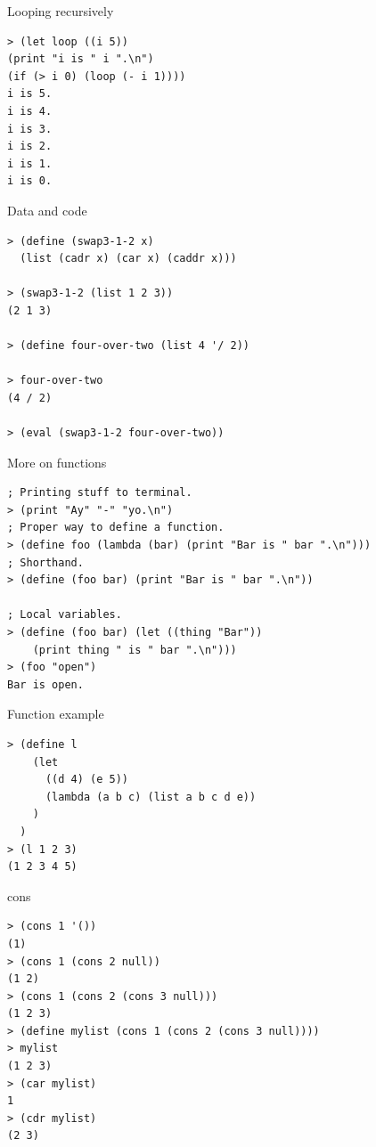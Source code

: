 \begin{frame}[fragile]{Looping recursively}
\begin{verbatim}
> (let loop ((i 5))
(print "i is " i ".\n")
(if (> i 0) (loop (- i 1))))
i is 5.
i is 4.
i is 3.
i is 2.
i is 1.
i is 0.
\end{verbatim}
\end{frame}

\begin{frame}[fragile]{Data and code}
\begin{verbatim}
> (define (swap3-1-2 x)
  (list (cadr x) (car x) (caddr x)))

> (swap3-1-2 (list 1 2 3))
(2 1 3)

> (define four-over-two (list 4 '/ 2))

> four-over-two
(4 / 2)

> (eval (swap3-1-2 four-over-two))
\end{verbatim}
\end{frame}

\begin{frame}[fragile]{More on functions}
\begin{verbatim}
; Printing stuff to terminal.
> (print "Ay" "-" "yo.\n")
; Proper way to define a function.
> (define foo (lambda (bar) (print "Bar is " bar ".\n")))
; Shorthand.
> (define (foo bar) (print "Bar is " bar ".\n"))

; Local variables.
> (define (foo bar) (let ((thing "Bar"))
    (print thing " is " bar ".\n")))
> (foo "open")
Bar is open.
\end{verbatim}
\end{frame}

\begin{frame}[fragile]{Function example}
  \begin{verbatim}
> (define l 
    (let
      ((d 4) (e 5))
      (lambda (a b c) (list a b c d e))
    )
  )
> (l 1 2 3)
(1 2 3 4 5)
  \end{verbatim}
\end{frame}

\begin{frame}[fragile]{cons}
\begin{verbatim}
> (cons 1 '())
(1)
> (cons 1 (cons 2 null))
(1 2)
> (cons 1 (cons 2 (cons 3 null)))
(1 2 3)
> (define mylist (cons 1 (cons 2 (cons 3 null))))
> mylist
(1 2 3)
> (car mylist)
1
> (cdr mylist)
(2 3)
\end{verbatim}
\end{frame}

